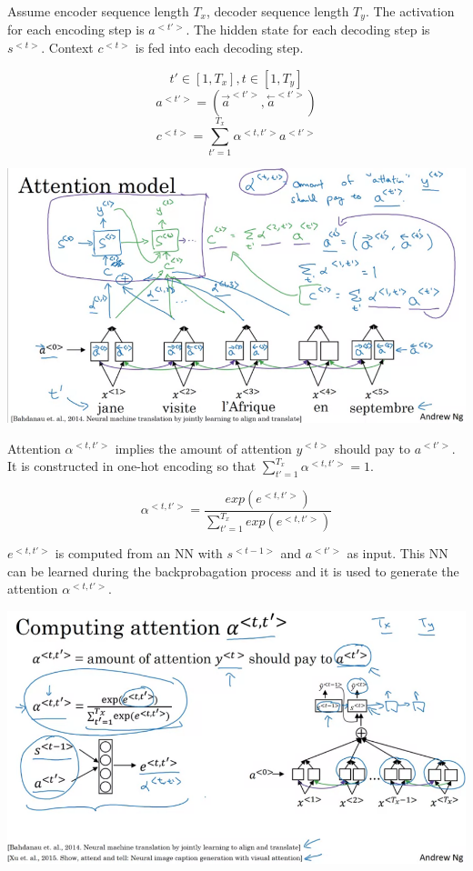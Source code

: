 \documentclass{article}
\begin{document}
\noindent Assume encoder sequence length \(T_{x}\), decoder sequence length \(T_{y}\). The activation for each encoding step is \(a^{<t'>}\). The hidden state for each decoding step is \(s^{<t>}\). Context \(c^{<t>}\) is fed into each decoding step.

\[t' \in [1, T_{x}], t \in [1, T_{y}]\]
\[a^{<t'>} = (\overset{\rightarrow}{a}^{<t'>}, \overset{\leftarrow}{a}^{<t'>})\]
\[c^{<t>} = \sum_{t' = 1}^{T_{x}} \alpha^{<t, t'>} a^{<t'>}\]

\begin{center}
\includegraphics[scale=0.3]{./images/attention_model.png}
\end{center}

\noindent Attention \(\alpha^{<t, t'>}\) implies the amount of attention \(y^{<t>}\) should pay to \(a^{<t'>}\). It is constructed in one-hot encoding so that \(\sum_{t' = 1}^{T_{x}} \alpha^{<t, t'>} = 1\).

\[\alpha^{<t, t'>} = \frac{exp(e^{<t, t'>})}{\sum_{t' = 1}^{T_{x}} exp(e^{<t, t'>})}\]

\noindent \(e^{<t, t'>}\) is computed from an NN with \(s^{<t - 1>}\) and \(a^{<t'>}\) as input. This NN can be learned during the backprobagation process and it is used to generate the attention \(\alpha^{<t, t'>}\).

\begin{center}
\includegraphics[scale=0.3]{./images/compute_attention.png}
\end{center}
\end{document}
